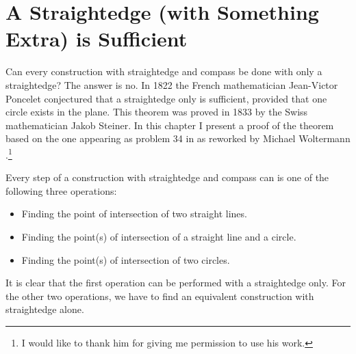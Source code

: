 
\chapter{A Straightedge (with Something Extra) is Sufficient}\label{c.straightedge}

Can every construction with straightedge and compass be done with only a straightedge? The answer is no. In 1822 the French mathematician Jean-Victor Poncelet conjectured that a straightedge only is sufficient, provided that one circle exists in the plane. This theorem was proved in 1833 by the Swiss mathematician Jakob Steiner. In this chapter I present a proof of the theorem based on the one appearing as problem 34 in \cite{dorrie1} as reworked by Michael Woltermann \cite{dorrie2}.\footnote{I would like to thank him for giving me permission to use his work.}

Every step of a construction with straightedge and compass can is one of the following three operations:
\begin{itemize}
\setlength{\itemsep}{0pt}
\item Finding the point of intersection of two straight lines.
\item Finding the point(s) of intersection of a straight line and a circle.
\item Finding the point(s) of intersection of two circles.
\end{itemize}
It is clear that the first operation can be performed with a straightedge only. For the other two operations, we have to find an equivalent construction with straightedge alone.

